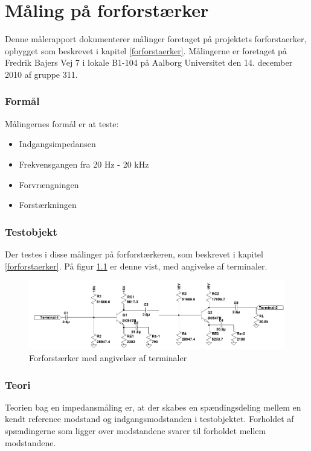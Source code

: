 \chapter{Måling på forforstærker}
\label{maaleforforstaerker}

Denne målerapport dokumenterer målinger foretaget på projektets forforstaerker, opbygget som beskrevet i kapitel \ref{forforstaerker}. Målingerne er foretaget på Fredrik Bajers Vej 7 i lokale B1-104 på Aalborg Universitet den 14. december 2010 af gruppe 311.

\subsection*{Formål}
Målingernes formål er at teste:
\begin{itemize}
\item Indgangsimpedansen
\item Frekvensgangen fra 20 Hz - 20 kHz
\item Forvrængningen
\item Forstærkningen
\end{itemize}

\subsection*{Testobjekt}
Der testes i disse målinger på forforstærkeren, som beskrevet i kapitel \ref{forforstaerker}. På figur \ref{fig:testob_forforstaerker} er denne vist, med angivelse af terminaler.

\begin{figure}[h]
\centering
\includegraphics[scale=0.42]{maalerapporter/forforstaerker/testobjekt-forforstaerker.png}
\caption{Forforstærker med angivelser af terminaler}
\label{fig:testob_forforstaerker}
\end{figure}

\subsection*{Teori}
\label{maalejournal_teori}
Teorien bag en impedansmåling er, at der skabes en spændingsdeling mellem en kendt reference modstand og indgangsmodstanden i testobjektet. Forholdet af spændingerne som ligger over modstandene svarer til forholdet mellem modstandene.

